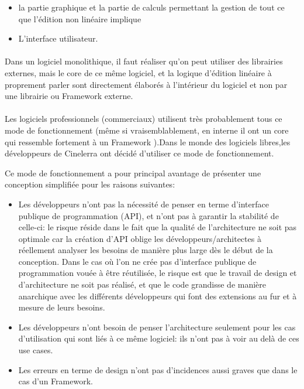 \begin{itemize} \setlength{\itemsep}{2mm}

  \item {la partie graphique et la partie de calculs
    permettant la gestion de tout ce que l'édition non linéaire
    implique}

  \item {L'interface utilisateur.}

\end {itemize}

\paragraph{}

Dans un logiciel monolithique, il faut réaliser qu'on
peut utiliser des librairies externes, mais le core de ce même logiciel,
et la logique d'édition linéaire à proprement parler sont directement
élaborés à l'intérieur du logiciel et non par une librairie ou
Framework  externe.

\paragraph{}

Les logiciels professionnels (commerciaux) utilisent très probablement
tous ce mode de fonctionnement (même si vraisemblablement,
en interne il ont un core qui ressemble fortement à un Framework
).Dans le monde des logiciels libres,les développeurs
de Cinelerra ont décidé d'utiliser ce mode de fonctionnement.

Ce mode de fonctionnement a pour principal avantage de présenter une
conception simplifiée pour les raisons suivantes:


\begin{itemize} \setlength{\itemsep}{2mm}

  \item {Les développeurs n'ont pas la nécessité de penser
    en terme d'interface publique de programmation (API), et
    n'ont pas à garantir la stabilité de celle-ci: le risque réside
    dans le fait que la qualité de l'architecture ne soit pas optimale
    car la création d'API oblige les développeurs/architectes
    à réellement analyser les besoins de manière plus large dès
    le début de la conception. Dans le cas où l'on ne crée pas
    d'interface publique de programmation vouée à être réutilisée,
    le risque est que le travail de design et d'architecture ne soit
    pas réalisé, et que le code grandisse de manière anarchique avec
    les différents développeurs qui font des extensions au fur et à
    mesure de leurs besoins.}

  \item {Les développeurs n'ont besoin de penser l'architecture seulement
  pour les cas d'utilisation qui sont liés à ce même logiciel:
    ils n'ont pas à voir au delà de ces use cases.}

  \item {Les erreurs en terme de design n'ont pas d'incidences aussi
    graves que dans le cas d'un Framework.}
\end {itemize}

